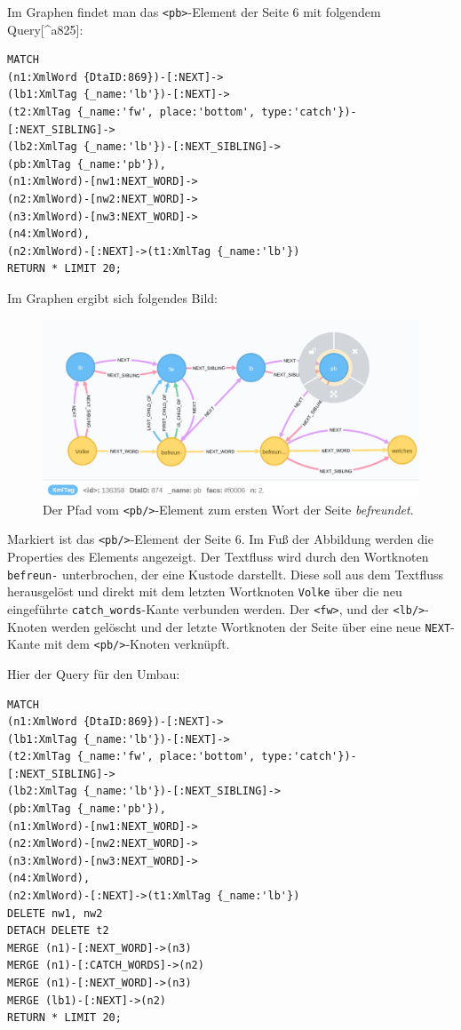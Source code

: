 Im Graphen findet man das \texttt{\textless{}pb\textgreater{}}-Element
der Seite 6 mit folgendem Query{[}\^{}a825{]}:

\begin{verbatim}
MATCH
(n1:XmlWord {DtaID:869})-[:NEXT]->
(lb1:XmlTag {_name:'lb'})-[:NEXT]->
(t2:XmlTag {_name:'fw', place:'bottom', type:'catch'})-[:NEXT_SIBLING]->
(lb2:XmlTag {_name:'lb'})-[:NEXT_SIBLING]->
(pb:XmlTag {_name:'pb'}),
(n1:XmlWord)-[nw1:NEXT_WORD]->
(n2:XmlWord)-[nw2:NEXT_WORD]->
(n3:XmlWord)-[nw3:NEXT_WORD]->
(n4:XmlWord),
(n2:XmlWord)-[:NEXT]->(t1:XmlTag {_name:'lb'})
RETURN * LIMIT 20;
\end{verbatim}

Im Graphen ergibt sich folgendes Bild:

\begin{figure}
\centering
\includegraphics{Bilder/TEI2Graph/pb6-Bestand.png}
\caption{Der Pfad vom \texttt{\textless{}pb/\textgreater{}}-Element zum
ersten Wort der Seite \emph{befreundet}.}
\end{figure}

Markiert ist das \texttt{\textless{}pb/\textgreater{}}-Element der Seite
6. Im Fuß der Abbildung werden die Properties des Elements angezeigt.
Der Textfluss wird durch den Wortknoten \texttt{befreun-} unterbrochen,
der eine Kustode darstellt. Diese soll aus dem Textfluss herausgelöst
und direkt mit dem letzten Wortknoten \texttt{Volke} über die neu
eingeführte \texttt{catch\_words}-Kante verbunden werden. Der
\texttt{\textless{}fw\textgreater{}}, und der
\texttt{\textless{}lb/\textgreater{}}-Knoten werden gelöscht und der
letzte Wortknoten der Seite über eine neue \texttt{NEXT}-Kante mit dem
\texttt{\textless{}pb/\textgreater{}}-Knoten verknüpft.

Hier der Query für den Umbau:

\begin{verbatim}
MATCH
(n1:XmlWord {DtaID:869})-[:NEXT]->
(lb1:XmlTag {_name:'lb'})-[:NEXT]->
(t2:XmlTag {_name:'fw', place:'bottom', type:'catch'})-[:NEXT_SIBLING]->
(lb2:XmlTag {_name:'lb'})-[:NEXT_SIBLING]->
(pb:XmlTag {_name:'pb'}),
(n1:XmlWord)-[nw1:NEXT_WORD]->
(n2:XmlWord)-[nw2:NEXT_WORD]->
(n3:XmlWord)-[nw3:NEXT_WORD]->
(n4:XmlWord),
(n2:XmlWord)-[:NEXT]->(t1:XmlTag {_name:'lb'})
DELETE nw1, nw2
DETACH DELETE t2
MERGE (n1)-[:NEXT_WORD]->(n3)
MERGE (n1)-[:CATCH_WORDS]->(n2)
MERGE (n1)-[:NEXT_WORD]->(n3)
MERGE (lb1)-[:NEXT]->(n2)
RETURN * LIMIT 20;
\end{verbatim}

